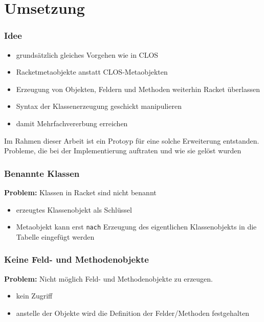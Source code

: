 \documentclass{beamer}
\begin{document}
\section{Umsetzung}
\frame{\tableofcontents[currentsection]}

\begin{frame}
 \frametitle{Idee}
 \begin{itemize}
  \item grundsätzlich gleiches Vorgehen wie in CLOS
  \item Racketmetaobjekte anstatt CLOS-Metaobjekten
  \item Erzeugung von Objekten, Feldern und Methoden weiterhin Racket überlassen
  \item Syntax der Klassenerzeugung geschickt manipulieren
  \item damit Mehrfachvererbung erreichen
 \end{itemize}
 \vspace{0.5cm}
 Im Rahmen dieser Arbeit ist ein Protoyp für eine solche Erweiterung entstanden.\\
 \textbf{\textrightarrow} Probleme, die bei der Implementierung auftraten und wie sie gelöst wurden
\end{frame}

\begin{frame}
 \frametitle{Benannte Klassen}
 \textbf{Problem:} Klassen in Racket sind nicht benannt
 \vspace{0.5cm}
 \begin{itemize}
  \item[\textbf{\textrightarrow}] erzeugtes Klassenobjekt als Schlüssel
  \item[\textbf{\textrightarrow}] Metaobjekt kann erst \texttt{nach} Erzeugung des eigentlichen Klassenobjekts in die Tabelle eingefügt werden
 \end{itemize}
\end{frame}


\begin{frame}
 \frametitle{Keine Feld- und Methodenobjekte}
 \textbf{Problem:} Nicht möglich Feld- und Methodenobjekte zu erzeugen.
 \vspace{0.5cm}
 \begin{itemize}
  \item kein Zugriff 
  \item[\textbf{\textrightarrow}] anstelle der Objekte wird die Definition der Felder/Methoden festgehalten
 \end{itemize}
\end{frame}
\end{document}
